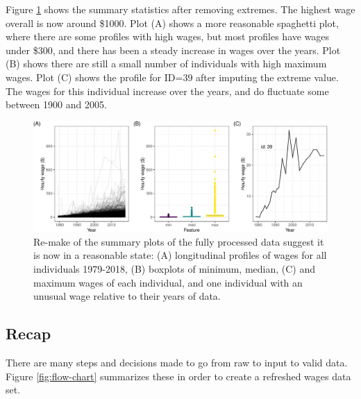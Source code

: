 \documentclass[12pt]{article}
\begin{document}
Figure \ref{fig:fixed-feature-plot} shows the summary statistics after removing extremes. The highest wage overall is now around \$1000. Plot (A) shows a more reasonable spaghetti plot, where there are some profiles with high wages, but most profiles have wages under \$300, and there has been a steady increase in wages over the years. Plot (B) shows there are still a small number of individuals with high maximum wages. Plot (C) shows the profile for ID=39 after imputing the extreme value. The wages for this individual increase over the years, and do fluctuate some between 1900 and 2005.

\begin{figure}

{\centering \includegraphics[width=1\linewidth]{figures/fixed-feature-plot-1} 

}

\caption{Re-make of the summary plots of the fully processed data suggest it is now in a reasonable state: (A) longitudinal profiles of wages for all individuals 1979-2018, (B) boxplots of minimum, median, (C) and maximum wages of each individual, and one individual with an unusual wage relative to their years of data. }\label{fig:fixed-feature-plot}
\end{figure}

\hypertarget{recap}{%
\subsection{Recap}\label{recap}}

There are many steps and decisions made to go from raw to input to valid data. Figure \ref{fig:flow-chart} summarizes these in order to create a refreshed wages data set.
\end{document}

